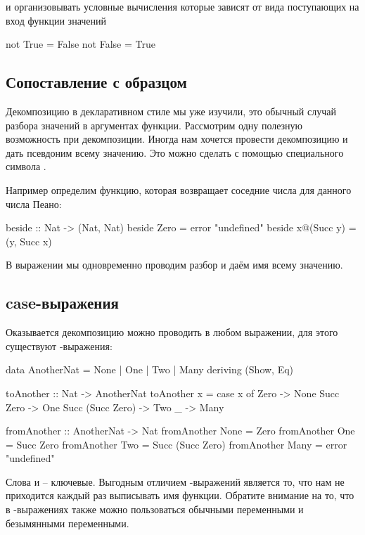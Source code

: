 и организовывать условные вычисления которые зависят от вида поступающих
на вход функции значений


\begin{code}
not True  = False
not False = True
\end{code}

\subsection{Сопоставление с образцом}

Декомпозицию в декларативном стиле мы уже изучили, это обычный случай
разбора значений в аргументах функции. Рассмотрим одну полезную
возможность при декомпозиции. Иногда нам хочется провести декомпозицию и
дать псевдоним всему значению. Это можно сделать с помощью специального
символа .

Например определим функцию, которая возвращает соседние числа для
данного числа Пеано:


\begin{code}
beside :: Nat -> (Nat, Nat)
beside  Zero       = error "undefined"
beside  x@(Succ y) = (y, Succ x)
\end{code}

В выражении  мы одновременно проводим разбор и даём имя
всему значению.

\subsection{case-выражения}

Оказывается декомпозицию можно проводить в любом выражении, для этого
существуют  -выражения:


\begin{code}
data AnotherNat = None | One | Two | Many
    deriving (Show, Eq)

toAnother :: Nat -> AnotherNat
toAnother x = 
    case x of
        Zero                -> None
        Succ Zero           -> One
        Succ (Succ Zero)    -> Two
        _                   -> Many

fromAnother :: AnotherNat -> Nat
fromAnother None    = Zero
fromAnother One     = Succ Zero
fromAnother Two     = Succ (Succ Zero)
fromAnother Many    = error "undefined" 
\end{code}

Слова  и  -- ключевые. Выгодным отличием
-выражений является то, что нам не приходится каждый раз
выписывать имя функции. Обратите внимание на то, что в
-выражениях также можно пользоваться обычными переменными и
безымянными переменными.


